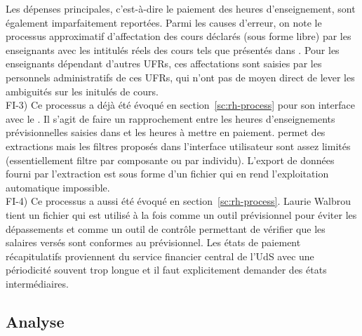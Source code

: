 \documentclass{book}
\begin{document}
Les dépenses principales, c'est-à-dire le paiement des heures d'enseignement, sont
également imparfaitement reportées. Parmi les causes d'erreur, on note le processus 
approximatif d'affectation des cours déclarés (sous forme libre) par les enseignants
avec les intitulés réels des cours tels que présentés dans . Pour les
enseignants dépendant d'autres UFRs, ces affectations sont saisies par les 
personnels administratifs de ces UFRs, qui n'ont pas de moyen direct de lever les
ambiguités sur les initulés de cours.\\

 

FI-3) Ce processus a déjà été évoqué en section~\ref{sc:rh-process} pour son
interface avec le \srh. Il s'agit de faire un rapprochement entre les heures 
d'enseignements prévisionnelles saisies dans  et les heures à 
mettre en paiement.  permet des extractions mais les filtres 
proposés dans l'interface utilisateur sont assez limités (essentiellement 
filtre par composante ou par individu). L'export de données fourni par 
l'extraction est sous forme d'un fichier  qui en rend l'exploitation 
automatique impossible.
\\

FI-4) Ce processus a aussi été évoqué en section~\ref{sc:rh-process}.
Laurie Walbrou tient un fichier  qui est utilisé à la
fois comme un outil prévisionnel pour éviter les dépassements et
comme un outil de contrôle permettant de vérifier que les salaires
versés sont conformes au prévisionnel. Les états de paiement récapitulatifs
proviennent du service financier central de l'UdS avec une périodicité 
souvent trop longue et il faut explicitement demander des états intermédiaires.




\subsection{Analyse}
\end{document}
